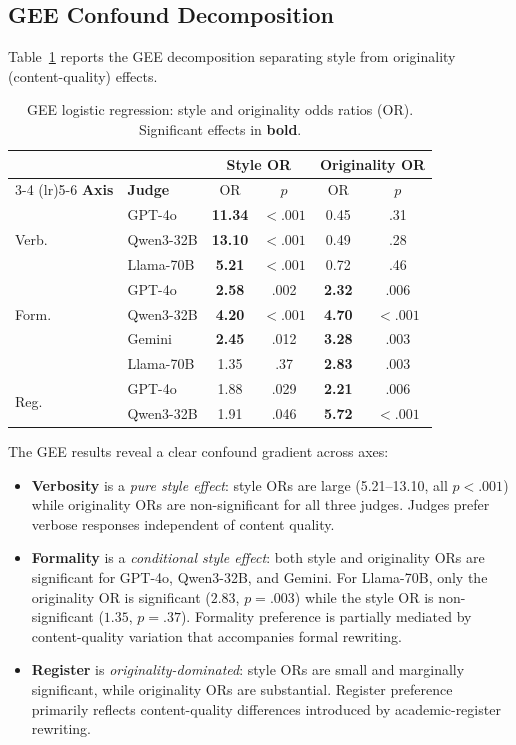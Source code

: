 \documentclass[11pt]{article}
\begin{document}
\subsection{GEE Confound Decomposition}

Table~\ref{tab:gee} reports the GEE decomposition separating style from originality (content-quality) effects.

\begin{table}[t]
\centering
\small
\caption{GEE logistic regression: style and originality odds ratios (OR). Significant effects in \textbf{bold}.}
\label{tab:gee}
\begin{tabular}{ll cc cc}
\toprule
& & \multicolumn{2}{c}{\textbf{Style OR}} & \multicolumn{2}{c}{\textbf{Originality OR}} \\
\cmidrule(lr){3-4} \cmidrule(lr){5-6}
\textbf{Axis} & \textbf{Judge} & OR & $p$ & OR & $p$ \\
\midrule
\multirow{3}{*}{Verb.}
 & GPT-4o    & \textbf{11.34} & ${<}.001$ & 0.45 & .31 \\
 & Qwen3-32B & \textbf{13.10} & ${<}.001$ & 0.49 & .28 \\
 & Llama-70B & \textbf{5.21}  & ${<}.001$ & 0.72 & .46 \\
\midrule
\multirow{3}{*}{Form.}
 & GPT-4o    & \textbf{2.58} & .002 & \textbf{2.32} & .006 \\
 & Qwen3-32B & \textbf{4.20} & ${<}.001$ & \textbf{4.70} & ${<}.001$ \\
 & Gemini    & \textbf{2.45} & .012 & \textbf{3.28} & .003 \\
 & Llama-70B & 1.35 & .37  & \textbf{2.83} & .003 \\
\midrule
\multirow{2}{*}{Reg.}
 & GPT-4o    & 1.88 & .029 & \textbf{2.21} & .006 \\
 & Qwen3-32B & 1.91 & .046 & \textbf{5.72} & ${<}.001$ \\
\bottomrule
\end{tabular}
\end{table}

The GEE results reveal a clear confound gradient across axes:

\begin{itemize}
\item \textbf{Verbosity} is a \emph{pure style effect}: style ORs are large (5.21--13.10, all $p < .001$) while originality ORs are non-significant for all three judges. Judges prefer verbose responses independent of content quality.
\item \textbf{Formality} is a \emph{conditional style effect}: both style and originality ORs are significant for GPT-4o, Qwen3-32B, and Gemini. For Llama-70B, only the originality OR is significant ($2.83$, $p = .003$) while the style OR is non-significant ($1.35$, $p = .37$). Formality preference is partially mediated by content-quality variation that accompanies formal rewriting.
\item \textbf{Register} is \emph{originality-dominated}: style ORs are small and marginally significant, while originality ORs are substantial. Register preference primarily reflects content-quality differences introduced by academic-register rewriting.
\end{itemize}
\end{document}
